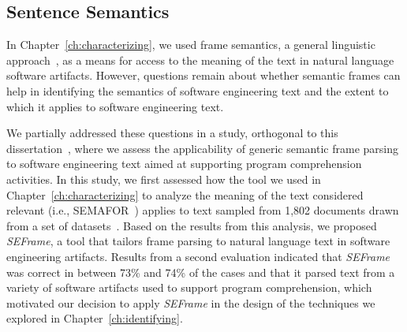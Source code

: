








\subsection{Sentence Semantics}
\label{cp7:semantics}




In Chapter~\ref{ch:characterizing}, we used frame semantics, a general linguistic approach~\cite{fillmore1976frame},
as a means for access to the meaning of the text in natural language software artifacts.
However, questions remain about whether
semantic frames can help in identifying the semantics of software engineering text
and the extent to which it applies to software engineering text.




We partially addressed these questions in a study, 
orthogonal to this dissertation~\cite{marques2021},
where we assess the applicability of generic semantic frame
parsing to software engineering text
aimed at supporting program
comprehension activities.
In this study, we first assessed how the tool we used in Chapter~\ref{ch:characterizing}
to analyze the meaning of the text considered relevant (i.e., SEMAFOR~\cite{das2014frame})
 applies to text sampled from 1,802 documents drawn from a set of datasets~\cite{Arya2019, Xu2017, Maalej2013, Chaparro2017}. 
Based on the results from this analysis, 
we proposed \textit{SEFrame}, a tool that tailors 
frame parsing to natural language text in software engineering artifacts.
Results from a second evaluation indicated that \textit{SEFrame} was 
 correct in between 73\% and 74\% of
the cases and that it parsed text from a variety of software artifacts used to support program
comprehension, which motivated our decision to apply \textit{SEFrame} 
in the design of the techniques we explored in Chapter~\ref{ch:identifying}.


